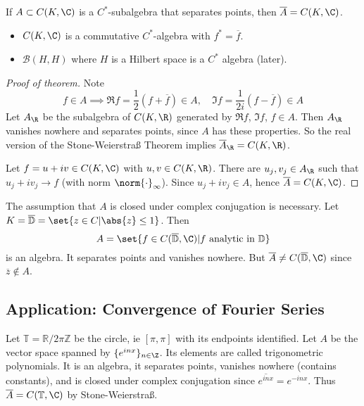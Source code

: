 \documentclass{article}
\begin{document}
\begin{cor}
    If $A \subset C(K, \C)$ is a $C^*$-subalgebra that separates points, then $\overline{A} = C(K, \C)$.
\end{cor}

\begin{eg}
    \leavevmode
    \begin{itemize}
        \item $C(K, \C)$ is a commutative $C^*$-algebra with $f^* = \overline{f}$.
        \item $\mathcal{B}(H, H)$ where $H$ is a Hilbert space is a $C^*$ algebra (later).
    \end{itemize}
\end{eg}

\begin{proof}[Proof of theorem]
    Note
    \begin{equation*}
        f \in A \implies \Re f = \frac{1}{2} (f + \overline{f}) \in A, \quad \Im f = \frac{1}{2i}(f - \overline{f}) \in A
    \end{equation*}
    Let $A_\R$ be the subalgebra of $C(K, \R)$ generated by $\Re f$, $\Im f$, $f \in A$.
    Then $A_\R$ vanishes nowhere and separates points, since $A$ has these properties.
    So the real version of the Stone-Weierstra{\ss} Theorem implies $\overline{A}_\R = C(K, \R)$.

    Let $f = u + i v \in C(K, \C)$ with $u, v \in C(K, \R)$. There are $u_j, v_j \in A_\R$ such that $u_j + i v_j \to f$ (with norm $\norm{\cdot}_\infty$).
    Since $u_j + i v_j \in A$, hence $\overline{A} = C(K, \C)$.
\end{proof}

\begin{eg}
    The assumption that $A$ is closed under complex conjugation is necessary.
    Let $K = \overline{\mathbb{D}} = \set{z \in C | \abs{z} \leq 1}$.
    Then
    \begin{equation*}
        A = \set{f \in C(\overline{\mathbb{D}}, \C) | f \text{ analytic in } \mathbb{D}}
    \end{equation*}
    is an algebra.
    It separates points and vanishes nowhere. But $\overline{A} \neq C(\overline{\mathbb{D}}, \C)$ since $\overline{z} \notin A$.
\end{eg}

\subsection{Application: Convergence of Fourier Series}
Let $\mathbb{T} = \mathbb{R}/2\pi\mathbb{Z}$ be the circle, ie $[\pi, \pi]$ with its endpoints identified.
Let $A$ be the vector space spanned by $\{e^{i n x}\}_{n \in \Z}$.
Its elements are called trigonometric polynomials.
It is an algebra, it separates points, vanishes nowhere (contains constants), and is closed under complex conjugation since $\overline{e^{i n x}} = e^{-i n x}$.
Thus $\overline{A} = C(\mathbb{T}, \C)$ by Stone-Weierstra{\ss}.
\end{document}
